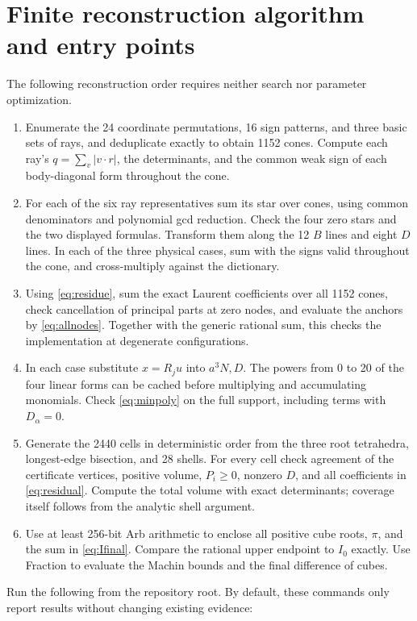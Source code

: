 \documentclass[11pt,a4paper]{article}
\theoremstyle{remark}\newtheorem{remark}[theorem]{Remark}
\newcommand{\1}{\mathbf1}\newcommand{\pos}[1]{(#1)_+}
\begin{document}
\appendix
\section{Finite reconstruction algorithm and entry points}
The following reconstruction order requires neither search nor parameter optimization.
\begin{enumerate}
 \item Enumerate the 24 coordinate permutations, 16 sign patterns, and three basic sets of rays, and deduplicate exactly to obtain 1152 cones. Compute each ray's $q=\sum_v|v\cdot r|$, the determinants, and the common weak sign of each body-diagonal form throughout the cone.
 \item For each of the six ray representatives sum its star over cones, using common denominators and polynomial gcd reduction. Check the four zero stars and the two displayed formulas. Transform them along the 12 $B$ lines and eight $D$ lines. In each of the three physical cases, sum with the signs valid throughout the cone, and cross-multiply against the dictionary.
 \item Using \eqref{eq:residue}, sum the exact Laurent coefficients over all 1152 cones, check cancellation of principal parts at zero nodes, and evaluate the anchors by \eqref{eq:allnodes}. Together with the generic rational sum, this checks the implementation at degenerate configurations.
 \item In each case substitute $x=R_ju$ into $a^3N,D$. The powers from 0 to 20 of the four linear forms can be cached before multiplying and accumulating monomials. Check \eqref{eq:minpoly} on the full support, including terms with $D_\alpha=0$.
 \item Generate the 2440 cells in deterministic order from the three root tetrahedra, longest-edge bisection, and 28 shells. For every cell check agreement of the certificate vertices, positive volume, $P_i\ge0$, nonzero $D$, and all coefficients in \eqref{eq:residual}. Compute the total volume with exact determinants; coverage itself follows from the analytic shell argument.
 \item Use at least 256-bit Arb arithmetic to enclose all positive cube roots, $\pi$, and the sum in \eqref{eq:Ifinal}. Compare the rational upper endpoint to $I_0$ exactly. Use Fraction to evaluate the Machin bounds and the final difference of cubes.
\end{enumerate}
Run the following from the repository root. By default, these commands only report results without changing existing evidence:
\end{document}
